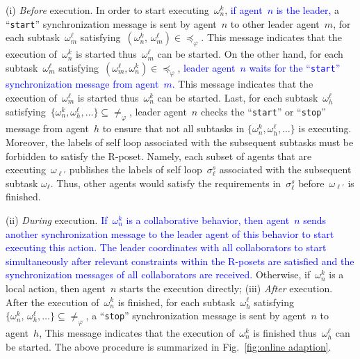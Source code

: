 (i) \emph{Before} execution.
In order to start executing~$\omega^k_n$, \textcolor{blue}{if agent~$n$ is the leader,}
a ``\texttt{start}'' synchronization message is sent by agent~$n$ to other leader agent~$m$,
for each subtask~$\omega^\ell_m$
satisfying~$(\omega^k_n,\,\omega^\ell_m)\in \preceq_{\varphi}$.
This message indicates that the execution of~$\omega^k_n$ is started
thus~$\omega^\ell_m$ can be started.
On the other hand, for each subtask~$\omega^\ell_m$
satisfying~$(\omega^\ell_m, \omega^k_n)\in \preceq_{\varphi}$,
\textcolor{blue}{leader agent~$n$ waits for the ``\texttt{start}'' synchronization message
from agent~$m$.}
This message indicates that the execution of~$\omega^\ell_m$ is started
thus~$\omega^k_n$ can be started.
Last, for each subtask~$\omega^\ell_h$
satisfying~$\{\omega^k_n,\omega^\ell_h,\dots\}\subseteq \neq_{\varphi}$,
leader agent~$n$ checks the ``\texttt{start}'' or ``\texttt{stop}'' message
from agent~$h$ to ensure that not all subtasks in $\{\omega^k_n,\omega^\ell_h,\dots\}$ is executing.
Moreover, the labels of self loop associated with the subsequent subtasks must be forbidden to satisfy the R-poset.
Namely, each subset of agents that are executing~$\omega_{\ell'}$ publishes
the labels of self loop~$\sigma^s_\ell$ associated with the subsequent subtask $\omega_\ell$.
Thus, other agents would satisfy the requirements in~$\sigma^s_\ell$
before~$\omega_{\ell'}$ is finished.


(ii) \emph{During} execution.
\textcolor{blue}{If~$\omega^k_n$ is a collaborative behavior, then
agent~$n$ sends another synchronization message to the leader agent
of this behavior to start executing this action. 
The leader coordinates with all collaborators to start simultaneously
after relevant constraints within the R-posets are satisfied and
the synchronization messages of all collaborators are received. }
Otherwise, if~$\omega^k_n$ is a local action, then agent~$n$ starts the
execution directly;
(iii) \emph{After} execution.
After the execution of~$\omega^k_n$ is finished,
for each subtask~$\omega^\ell_h$
satisfying~$\{\omega^k_n,\,\omega^\ell_h,\dots\}\subseteq \neq_{\varphi}$,
a ``\texttt{stop}'' synchronization message is sent by agent~$n$ to agent~$h$,
This message indicates that the execution of~$\omega^k_n$ is finished
thus~$\omega^\ell_h$ can be started.
The above procedure is summarized in Fig.~\ref{fig:online adaption}.

